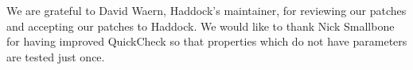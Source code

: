 \documentclass[preprint]{sigplanconf}
\begin{document}




\acks

We are grateful to David Waern, Haddock's maintainer, for reviewing our patches
and accepting our patches to Haddock.
We would like to thank
Nick Smallbone for having improved QuickCheck so that
properties which do not have parameters are tested just once.




\end{document}
